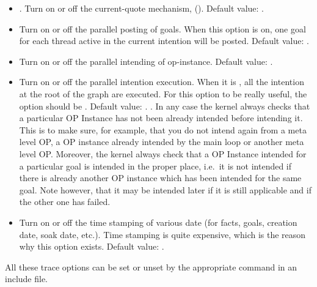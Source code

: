 \begin{itemize}

\item {}. Turn on or off the current-quote
mechanism, (). Default value: .

\item {} Turn on or off the parallel posting of
goals. When this option is on, one goal for each thread active in the
current intention will be posted. Default value: .

\item {} Turn on or off the parallel intending
of op-instance. Default value: .

\item {} Turn on or off the parallel
intention execution. When it is , all the intention at the root of the
graph are executed. For this option to be really useful, the   option should be . Default value: .
. In any case the kernel always checks that a particular
OP Instance has not been already intended before intending it. This is to make
sure, for example, that you do not intend again from a meta level OP, a OP
instance already intended by the main loop or another meta level OP. Moreover,
the kernel always check that a OP Instance intended for a particular goal is
intended in the proper place, i.e.\ it is not intended if there is already
another OP instance which has been intended for the same goal. Note however,
that it may be intended later if it is still applicable and if the other one
has failed.

\item {} Turn on or off the time stamping of
various date (for facts, goals, creation date, soak date, etc.). Time stamping
is quite expensive, which is the reason why this option exists.  Default value:
.

\end{itemize}

All these trace options can be set or unset by the appropriate command in
an include file.

